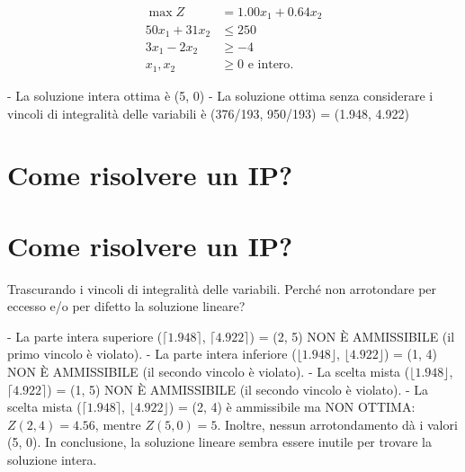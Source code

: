 \documentclass[a4paper, 11pt]{article}
\begin{document}
        \begin{align*}
        \max Z &= 1.00x_1 + 0.64x_2 \\
        50x_1 + 31x_2 &\le 250 \\
        3x_1 - 2x_2 &\ge -4 \\
        x_1, x_2 &\ge 0 \text{ e intero}.
        \end{align*}

        - La soluzione intera ottima è (5, 0)
        - La soluzione ottima senza considerare i vincoli di integralità delle variabili è (376/193, 950/193) = (1.948, 4.922)

        \section*{Come risolvere un IP?}

        \section*{Come risolvere un IP?}

        Trascurando i vincoli di integralità delle variabili. Perché non arrotondare per eccesso e/o per difetto la soluzione lineare?

        - La parte intera superiore ($\lceil 1.948 \rceil$, $\lceil 4.922 \rceil$) = (2, 5) NON È AMMISSIBILE (il primo vincolo è violato).
        - La parte intera inferiore ($\lfloor 1.948 \rfloor$, $\lfloor 4.922 \rfloor$) = (1, 4) NON È AMMISSIBILE (il secondo vincolo è violato).
        - La scelta mista ($\lfloor 1.948 \rfloor$, $\lceil 4.922 \rceil$) = (1, 5) NON È AMMISSIBILE (il secondo vincolo è violato).
        - La scelta mista ($\lceil 1.948 \rceil$, $\lfloor 4.922 \rfloor$) = (2, 4) è ammissibile ma NON OTTIMA:
        $Z(2, 4) = 4.56$, mentre $Z(5, 0) = 5$.
        Inoltre, nessun arrotondamento dà i valori (5, 0).
        In conclusione, la soluzione lineare sembra essere inutile per trovare la soluzione intera.

        
\end{document}
